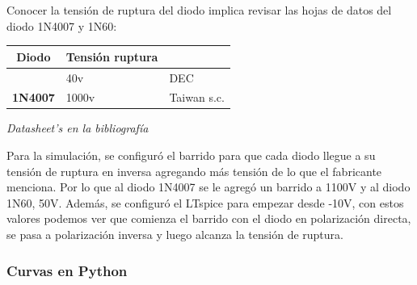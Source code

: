 \sangria{} Conocer la tensión de ruptura del diodo implica revisar las hojas de datos del diodo 1N4007 y 1N60:
\begin{center}
    \begin{tabular}{|c|l|l|}
    \rowcolor[HTML]{FFCE93}
    \hline
    \textbf{Diodo} & 
    \multicolumn{1}{c|}{\cellcolor[HTML]{FFCE93}\textbf{Tensión ruptura}} & 
    \multicolumn{1}{c}{\cellcolor[HTML]{FFCE93}{\color[HTML]{000000} \textbf{Fabricante}}} 
    \\ 
    \hline
    \cellcolor[HTML]{FFFC9E}{\color[HTML]{000000} \textbf{1N60}} &
    40v &
    DEC \\
    \hline 
    \cellcolor[HTML]{FFFC9E}\textbf{1N4007} &
    1000v & 
    Taiwan s.c. \\ 
    \hline
    \end{tabular}
\end{center}

\begin{center} \textit{Datasheet's en la bibliografía} \end{center}

\sangria{} Para la simulación, se configuró el barrido para que cada diodo llegue a su tensión de ruptura en inversa agregando más tensión de lo que el fabricante menciona. Por lo que al diodo 1N4007 se le agregó un barrido a 1100V y al diodo 1N60, 50V. Además, se configuró el LTspice para empezar desde -10V, con estos valores podemos ver que comienza el barrido con el diodo en polarización directa, se pasa a polarización inversa y luego alcanza la tensión de ruptura.





\inicioCodigo{}
\subsubsection{Curvas en Python}


